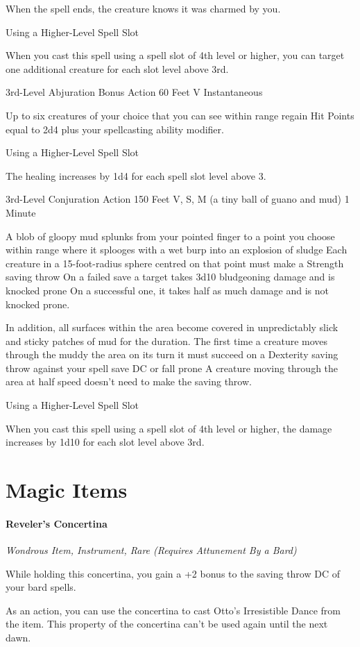 \documentclass[letterpaper,openany,oneside,twocolumn]{book}
\begin{document}
When the spell ends, the creature knows it was charmed by you.

\subparagraph*{Using a Higher-Level Spell Slot} When you cast this spell using a spell slot of 4th level or higher, you can target one additional creature for each slot level above 3rd.

	{3rd-Level Abjuration}
	{Bonus Action}
	{60 Feet}
	{V}
	{Instantaneous}

Up to six creatures of your choice that you can see within range regain Hit Points equal to 2d4 plus your spellcasting ability modifier.

\subparagraph*{Using a Higher-Level Spell Slot} The healing increases by 1d4 for each spell slot level above 3.

	{3rd-Level Conjuration}
	{Action}
	{150 Feet}
	{V, S, M (a tiny ball of guano and mud)}
	{1 Minute}

A blob of gloopy mud splunks from your pointed finger to a point you choose within range where it splooges with a wet burp into an explosion of sludge Each creature in a 15-foot-radius sphere centred on that point must make a Strength saving throw On a failed save a target takes 3d10 bludgeoning damage and is knocked prone On a successful one, it takes half as much damage and is not knocked prone.

In addition, all surfaces within the area become covered in unpredictably slick and sticky patches of mud for the duration. The first time a creature moves through the muddy the area on its turn it must succeed on a Dexterity saving throw against your spell save DC or fall prone A creature moving through the area at half speed doesn't need to make the saving throw.

\subparagraph*{Using a Higher-Level Spell Slot} When you cast this spell using a spell slot of 4th level or higher, the damage increases by 1d10 for each slot level above 3rd.

\part*{Magic Items}
\subsection*{Reveler's Concertina}
\textit{Wondrous Item, Instrument, Rare (Requires Attunement By a Bard)}\\
{\entryfont While holding this concertina, you gain a +2 bonus to the saving throw DC of your bard spells.

As an action, you can use the concertina to cast Otto's Irresistible Dance from the item. This property of the concertina can't be used again until the next dawn.}
\end{document}
